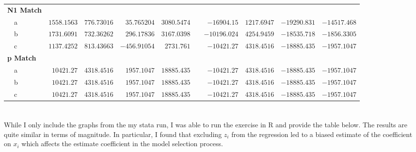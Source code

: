 \documentclass[12pt]{article}
\begin{document}
\begin{landscape}
\begin{table}
\begin{tabular}{lrrrrcrrrr}
\hline
{\bfseries N1 Match}&&&&&&&&&\tabularnewline
~~a&$ 1558.1563$&$ 776.73016$&$ 35.765204$&$ 3080.5474   $&&   $ -16904.15$&$ 1217.6947$&$-19290.831$&$-14517.468$ \tabularnewline
~~b&$ 1731.6091$&$ 732.36262$&$ 296.17836$&$ 3167.0398   $&&   $-10196.024$&$ 4254.9459$&$-18535.718$&$-1856.3305$ \tabularnewline
~~c&$ 1137.4252$&$ 813.43663$&$-456.91054$&$2731.761  $&&   $ -10421.27$&$ 4318.4516$&$-18885.435$&$-1957.1047$ \tabularnewline
\hline
{\bfseries p Match}&&&&&&&&&\tabularnewline
~~a&$10421.27$&$ 4318.4516$&$ 1957.1047$&$ 18885.435  $&&   $ -10421.27$&$ 4318.4516$&$-18885.435$&$-1957.1047$ \tabularnewline
~~b&$10421.27$&$ 4318.4516$&$ 1957.1047$&$ 18885.435  $&&   $ -10421.27$&$ 4318.4516$&$-18885.435$&$-1957.1047$ \tabularnewline
~~c&$10421.27$&$ 4318.4516$&$ 1957.1047$&$ 18885.435  $&&   $ -10421.27$&$ 4318.4516$&$-18885.435$&$-1957.1047$ \tabularnewline
\hline
\end{tabular}
\end{table}
\end{landscape}


\newpage
\section{}
\subsection{}
While I only include the graphs from the my stata run, I was able to run the exercise in R and provide the table below. The results are quite similar in terms of magnitude. In particular, I found that excluding $z_i$ from the regression led to a biased estimate of the coefficient on $x_i$ which affects the estimate coefficient in the model selection process.
\end{document}
